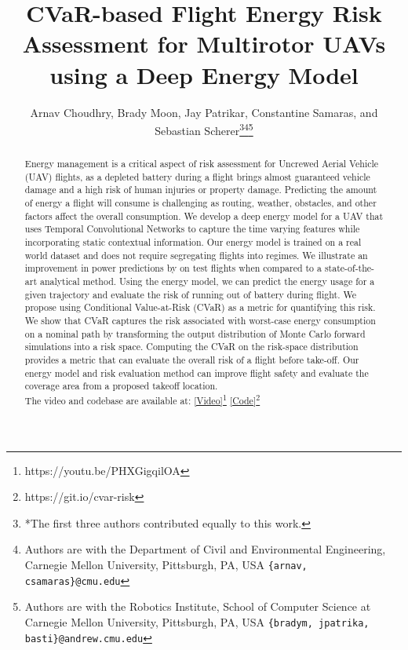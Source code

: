 \documentclass[letterpaper, 10 pt, conference]{ieeeconf}
\title{\LARGE \bf
CVaR-based Flight Energy Risk Assessment for Multirotor UAVs using a Deep Energy Model
}
\author{ Arnav Choudhry, Brady Moon, Jay Patrikar, Constantine Samaras, and Sebastian Scherer\thanks{*The first three authors contributed equally to this work.}\thanks{Authors are with the Department of Civil and Environmental Engineering, Carnegie Mellon University, Pittsburgh, PA, USA
        {\tt\small \{arnav, csamaras\}@cmu.edu}}\thanks{Authors are with the Robotics Institute, School of Computer Science at Carnegie Mellon University, Pittsburgh, PA, USA
{\tt\small  \{bradym, jpatrika, basti\}@andrew.cmu.edu}}}
\begin{document}
\maketitle
\thispagestyle{empty}
\pagestyle{empty}


\begin{abstract}

Energy management is a critical aspect of risk assessment for Uncrewed Aerial Vehicle (UAV) flights, as a depleted battery during a flight brings almost guaranteed vehicle damage and a high risk of human injuries or property damage. Predicting the amount of energy a flight will consume is challenging as routing, weather, obstacles, and other factors affect the overall consumption. We develop a deep energy model for a UAV that uses Temporal Convolutional Networks to capture the time varying features while incorporating static contextual information. Our energy model is trained on a real world dataset and does not require segregating flights into regimes. We illustrate an improvement in power predictions by  on test flights when compared to a state-of-the-art analytical method. Using the energy model, we can predict the energy usage for a given trajectory and evaluate the risk of running out of battery during flight. We propose using Conditional Value-at-Risk (CVaR) as a metric for quantifying this risk. We show that CVaR captures the risk associated with worst-case energy consumption on a nominal path by transforming the output distribution of Monte Carlo forward simulations into a risk space. Computing the CVaR on the risk-space distribution provides a metric that can evaluate the overall risk of a flight before take-off. Our energy model and risk evaluation method can improve flight safety and evaluate the coverage area from a proposed takeoff location. \\
The video and codebase are available at: \href{https://youtu.be/PHXGigqilOA}{[Video]\footnote{\url{https://youtu.be/PHXGigqilOA}}}  \href{https://git.io/cvar-risk}{[Code]\footnote{\url{https://git.io/cvar-risk}}}\\


\end{abstract}
\end{document}
